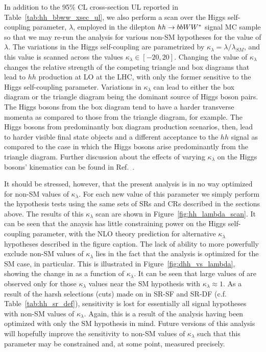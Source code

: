 In addition to the 95\% CL cross-section UL reported in Table~\ref{tab:hh_bbww_xsec_ul}, we also perform
a scan over the Higgs self-coupling parameter, $\lambda$, employed in the dilepton $hh \rightarrow bbWW^*$ signal MC sample
so that we may re-run the analysis for various non-SM hypotheses for the value of $\lambda$.
The variations in the Higgs self-coupling are parametrized by $\kappa_{\lambda} = \lambda / \lambda_{SM}$, and this
value is scanned across the values $\kappa_{\lambda} \in [-20, 20]$.
Changing the value of $\kappa_{\lambda}$ changes the relative strength of the competing triangle
and box diagrams that lead to $hh$ production at LO at the LHC, with only the former sensitive to
the Higgs self-coupling parameter.
Variations in $\kappa_{\lambda}$ can lead to either the box diagram or the triangle diagram being the dominant source of Higgs boson pairs.
The Higgs bosons from the box diagram tend to have a harder transverse momenta
as compared to those from the triangle diagram, for example.
The Higgs bosons from predominantly box diagram production scenarios, then, lead to harder visible final state objects
and a different acceptance to the $hh$ signal as compared to the case in which the Higgs bosons arise predominantly
from the triangle diagram.
Further discussion about the effects of varying $\kappa_{\lambda}$ on the Higgs bosons' kinematics can
be found in Ref.~\cite{HHComb36}.

It should be stressed, however, that the present analysis is in no way optimized for non-SM values of $\kappa_{\lambda}$.
For each new value of this parameter we simply perform the hypothesis tests using the same
sets of SRs and CRs described in the sections above.
The results of this $\kappa_{\lambda}$ scan are shown in Figure~\ref{fig:hh_lambda_scan}.
It can be seen that the anaysis has little constraining power on the Higgs self-coupling parameter, with
the NLO theory prediction for alternative $\kappa_{\lambda}$ hypotheses described in the figure caption.
The lack of ability to more powerfully exclude non-SM values of $\kappa_{\lambda}$ lies in the
fact that the analysis is optimized for the SM case, in particular.
This is illustrated in Figure~\ref{fig:dhh_vs_lambda}, showing the change in \dhh as a function
of $\kappa_{\lambda}$.
It can be seen that large values of \dhh are observed only for those $\kappa_{\lambda}$ values near
the SM hypothesis with $\kappa_{\lambda} \approx 1$.
As a result of the harsh selections (cuts) made on \dhh in SR-SF and SR-DF (c.f. Table~\ref{tab:hh_sr_def}),
sensitivity is lost for essentially all signal hypotheses with non-SM values of $\kappa_{\lambda}$.
Again, this is a result of the analysis having been optimized with only the SM hypothesis in mind.
Future versions of this analysis will hopefully improve the sensitivity to non-SM values of $\kappa_{\lambda}$
such that this parameter may be constrained and, at some point, measured precisely.

